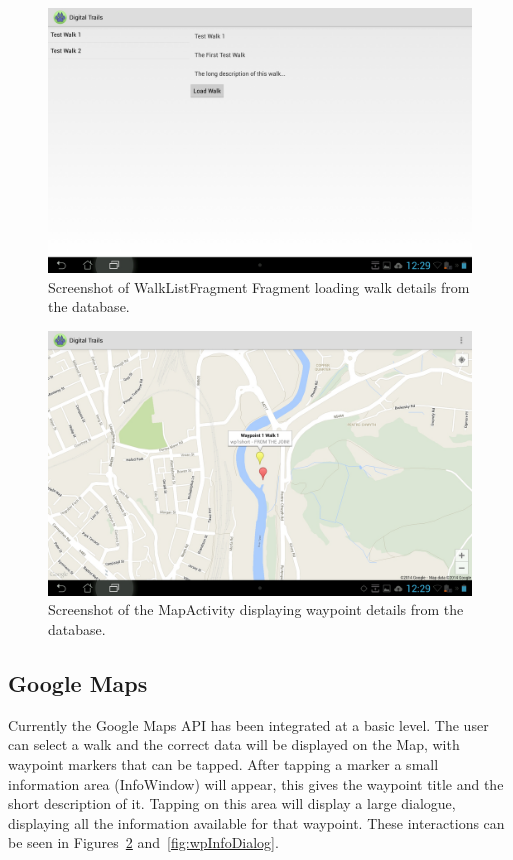 \documentclass[11pt,a4paper]{article}
\begin{document}
\begin{figure}[H]
\centering
\includegraphics[width=.7\linewidth]{walkListFragment.jpg}
\caption{Screenshot of WalkListFragment Fragment loading walk details from the database.}
\label{fig:walkListFragment}
\end{figure}


\begin{figure}[H]
\centering
\includegraphics[width=.7\linewidth]{googleMapsContentLoader.jpg}
\caption{Screenshot of the MapActivity displaying waypoint details from the database.}
\label{fig:googleContentLoader}
\end{figure}


\subsection{Google Maps}
\label{sec:googlemaps}
Currently the Google Maps API has been integrated at a basic level. The user can select a walk and the correct data will be displayed on the Map, with waypoint markers that can be tapped. After tapping a marker a small information area (InfoWindow) will appear, this gives the waypoint title and the short description of it. Tapping on this area will display a large dialogue, displaying all the information available for that waypoint. These interactions can be seen in Figures~\ref{fig:googleContentLoader} and~\ref{fig:wpInfoDialog}.
\end{document}
